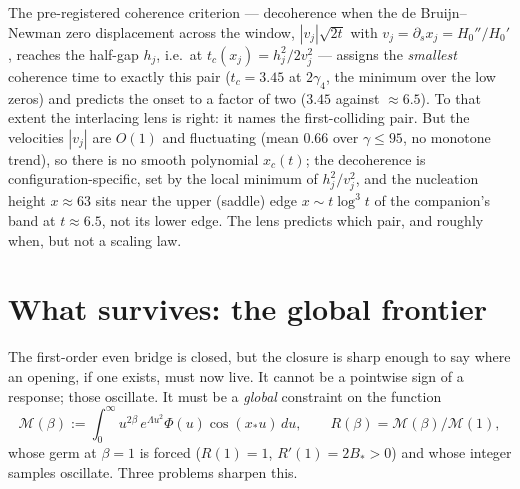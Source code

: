 \documentclass[11pt,reqno]{amsart}
\theoremstyle{plain}
\theoremstyle{definition}
\theoremstyle{remark}
\newcommand{\Mcal}{\mathcal M}
\begin{document}
The pre-registered coherence criterion --- decoherence when the de
Bruijn--Newman zero displacement across the window, $|v_j|\sqrt{2t}$ with
$v_j=\partial_sx_j=H_0''/H_0'$, reaches the half-gap $h_j$, i.e.\ at
$t_c(x_j)=h_j^2/2v_j^2$ --- assigns the \emph{smallest} coherence time to
exactly this pair ($t_c=3.45$ at $2\gamma_4$, the minimum over the low
zeros) and predicts the onset to a factor of two ($3.45$ against
$\approx6.5$). To that extent the interlacing lens is right: it names the
first-colliding pair. But the velocities $|v_j|$ are $O(1)$ and fluctuating
(mean $0.66$ over $\gamma\le95$, no monotone trend), so there is no smooth
polynomial $x_c(t)$; the decoherence is configuration-specific, set by the
local minimum of $h_j^2/v_j^2$, and the nucleation height $x\approx63$ sits
near the upper (saddle) edge $x\sim t\log^3t$ of the companion's band at
$t\approx6.5$, not its lower edge. The lens predicts which pair, and roughly
when, but not a scaling law.

\section{What survives: the global frontier}\label{sec:frontier}

The first-order even bridge is closed, but the closure is sharp enough to
say where an opening, if one exists, must now live. It cannot be a pointwise
sign of a response; those oscillate. It must be a \emph{global} constraint
on the function
\begin{equation}\label{eq:Mcal}
  \Mcal(\beta):=\int_0^\infty u^{2\beta}\,e^{\Lambda u^2}\Phi(u)
  \cos(x_*u)\,du,
  \qquad R(\beta)=\Mcal(\beta)/\Mcal(1),
\end{equation}
whose germ at $\beta=1$ is forced ($R(1)=1$, $R'(1)=2B_*>0$) and whose
integer samples oscillate. Three problems sharpen this.
\end{document}
